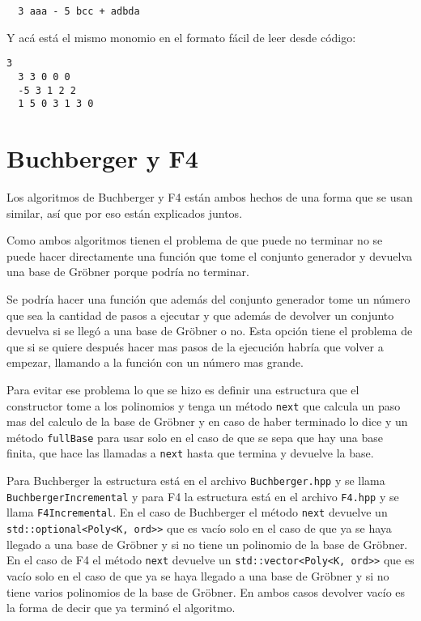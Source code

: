 \documentclass{report}
\theoremstyle{customstyle}
\theoremstyle{factstyle}
\begin{document}
\begin{lstlisting}
  3 aaa - 5 bcc + adbda
\end{lstlisting}

Y acá está el mismo monomio en el formato fácil de leer desde código:

\begin{lstlisting}[escapechar=+]
  3
  3 3 0 0 0
  -5 3 1 2 2
  1 5 0 3 1 3 0
\end{lstlisting}

\section{Buchberger y F4}

Los algoritmos de Buchberger y F4 están ambos hechos de una forma que se usan similar, así que por eso están explicados juntos.

Como ambos algoritmos tienen el problema de que puede no terminar no se puede hacer directamente una función que tome el conjunto generador y devuelva una base de Gröbner porque podría no terminar.

Se podría hacer una función que además del conjunto generador tome un número que sea la cantidad de pasos a ejecutar y que además de devolver un conjunto devuelva si se llegó a una base de Gröbner o no. Esta opción tiene el problema de que si se quiere después hacer mas pasos de la ejecución habría que volver a empezar, llamando a la función con un número mas grande.

Para evitar ese problema lo que se hizo es definir una estructura que el constructor tome a los polinomios y tenga un método \texttt{next} que calcula un paso mas del calculo de la base de Gröbner y en caso de haber terminado lo dice y un método \texttt{fullBase} para usar solo en el caso de que se sepa que hay una base finita, que hace las llamadas a \texttt{next} hasta que termina y devuelve la base.

Para Buchberger la estructura está en el archivo \texttt{Buchberger.hpp} y se llama \texttt{BuchbergerIncremental} y para F4 la estructura está en el archivo \texttt{F4.hpp} y se llama \texttt{F4Incremental}. En el caso de Buchberger el método \texttt{next} devuelve un \texttt{std::optional<Poly<K, ord>>} que es vacío solo en el caso de que ya se haya llegado a una base de Gröbner y si no tiene un polinomio de la base de Gröbner. En el caso de F4 el método \texttt{next} devuelve un \texttt{std::vector<Poly<K, ord>>} que es vacío solo en el caso de que ya se haya llegado a una base de Gröbner y si no tiene varios polinomios de la base de Gröbner. En ambos casos devolver vacío es la forma de decir que ya terminó el algoritmo.
\end{document}
